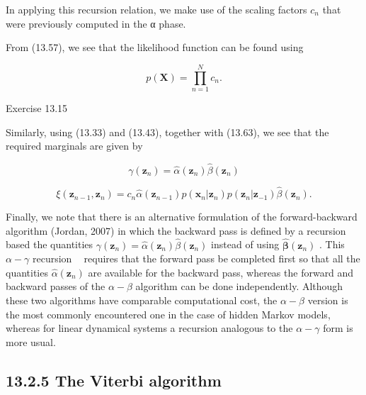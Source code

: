 \documentclass[
  10
]{article}
\begin{document}
In applying this recursion relation, we make use of the scaling factors
\(c _ { n }\) that were previously computed in the α phase.

From (13.57), we see that the likelihood function can be found using

\[
p (\mathbf {X}) = \prod_ {n = 1} ^ {N} c _ {n}.\tag{13.63}
\]

Exercise 13.15

Similarly, using (13.33) and (13.43), together with (13.63), we see that
the required marginals are given by

\[
\gamma (\mathbf {z} _ {n}) = \widehat {\alpha} (\mathbf {z} _ {n}) \widehat {\beta} (\mathbf {z} _ {n})\tag{13.64}
\]

\[
\xi (\mathbf {z} _ {n - 1}, \mathbf {z} _ {n}) = c _ {n} \widehat {\alpha} (\mathbf {z} _ {n - 1}) p (\mathbf {x} _ {n} | \mathbf {z} _ {n}) p (\mathbf {z} _ {n} | \mathbf {z} _ {- 1}) \widehat {\beta} (\mathbf {z} _ {n}).\tag{13.65}
\]

Finally, we note that there is an alternative formulation of the
forward-backward algorithm (Jordan, 2007) in which the backward pass is
defined by a recursion based the quantities
\(\gamma ( \mathbf { z } _ { n } ) = { \widehat { \alpha } } ( \mathbf { z } _ { n } ) { \widehat { \beta } } ( \mathbf { z } _ { n } )\)
instead of using
\({ \widehat { \boldsymbol { \beta } } } ( \mathbf { z } _ { n } )\) .
This \(\alpha - \gamma\) recursion  requires that the forward pass be
completed first so that all the quantities
\(\widehat { \alpha } ( \mathbf { z } _ { n } )\) are available for the
backward pass, whereas the forward and backward passes of the
\(\alpha { - } \beta\) algorithm can be done independently. Although
these two algorithms have comparable computational cost, the
\(\alpha { - } \beta\) version is the most commonly encountered one in
the case of hidden Markov models, whereas for linear dynamical systems a
recursion analogous to the \(\alpha - \gamma\) form is more usual.

\subsection{13.2.5 The Viterbi algorithm}\label{the-viterbi-algorithm}
\end{document}
